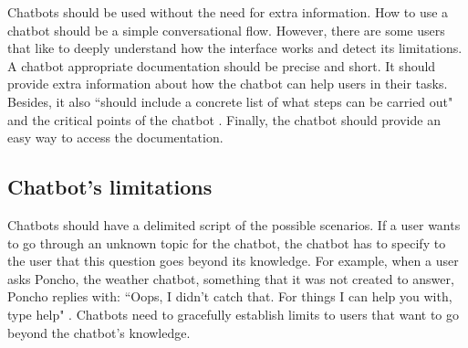 \documentclass[a4paper,10pt]{article}
\begin{document}
Chatbots should be used without the need for extra information. How to use a chatbot should be a simple conversational flow. However, there are some users that like to deeply understand how the interface works and detect its limitations. A chatbot appropriate documentation should be precise and short. It should provide extra information about how the chatbot can help users in their tasks. Besides, it also ``should include a concrete list of what steps can be carried out" and the critical points of the chatbot \cite{HeuristicsWebPage}. Finally, the chatbot should provide an easy way to access the documentation.   

\subsection*{Chatbot's limitations}

Chatbots should have a delimited script of the possible scenarios. If a user wants to go through an unknown topic for the chatbot, the chatbot has to specify to the user that this question goes beyond its knowledge. For example, when a user asks Poncho, the weather chatbot, something that it was not created to answer, Poncho replies with: ``Oops, I didn't catch that. For things I can help you with, type help" \cite{HeuristicsWebPage}. Chatbots need to gracefully establish limits to users that want to go beyond the chatbot's knowledge.  

\medskip


\end{document}
